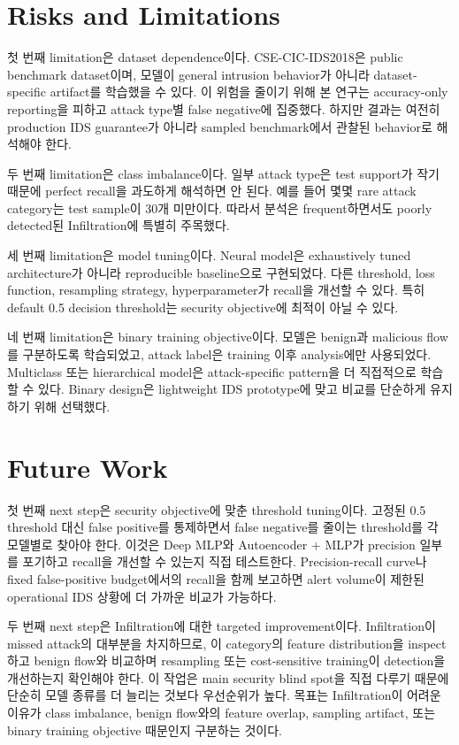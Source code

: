 \documentclass[sigconf,nonacm]{acmart}
\begin{document}
\section{Risks and Limitations}

첫 번째 limitation은 dataset dependence이다.
CSE-CIC-IDS2018은 public benchmark dataset이며, 모델이 general intrusion behavior가 아니라 dataset-specific artifact를 학습했을 수 있다.
이 위험을 줄이기 위해 본 연구는 accuracy-only reporting을 피하고 attack type별 false negative에 집중했다.
하지만 결과는 여전히 production IDS guarantee가 아니라 sampled benchmark에서 관찰된 behavior로 해석해야 한다.

두 번째 limitation은 class imbalance이다.
일부 attack type은 test support가 작기 때문에 perfect recall을 과도하게 해석하면 안 된다.
예를 들어 몇몇 rare attack category는 test sample이 30개 미만이다.
따라서 분석은 frequent하면서도 poorly detected된 Infiltration에 특별히 주목했다.

세 번째 limitation은 model tuning이다.
Neural model은 exhaustively tuned architecture가 아니라 reproducible baseline으로 구현되었다.
다른 threshold, loss function, resampling strategy, hyperparameter가 recall을 개선할 수 있다.
특히 default 0.5 decision threshold는 security objective에 최적이 아닐 수 있다.

네 번째 limitation은 binary training objective이다.
모델은 benign과 malicious flow를 구분하도록 학습되었고, attack label은 training 이후 analysis에만 사용되었다.
Multiclass 또는 hierarchical model은 attack-specific pattern을 더 직접적으로 학습할 수 있다.
Binary design은 lightweight IDS prototype에 맞고 비교를 단순하게 유지하기 위해 선택했다.

\section{Future Work}

첫 번째 next step은 security objective에 맞춘 threshold tuning이다.
고정된 0.5 threshold 대신 false positive를 통제하면서 false negative를 줄이는 threshold를 각 모델별로 찾아야 한다.
이것은 Deep MLP와 Autoencoder + MLP가 precision 일부를 포기하고 recall을 개선할 수 있는지 직접 테스트한다.
Precision-recall curve나 fixed false-positive budget에서의 recall을 함께 보고하면 alert volume이 제한된 operational IDS 상황에 더 가까운 비교가 가능하다.

두 번째 next step은 Infiltration에 대한 targeted improvement이다.
Infiltration이 missed attack의 대부분을 차지하므로, 이 category의 feature distribution을 inspect하고 benign flow와 비교하며 resampling 또는 cost-sensitive training이 detection을 개선하는지 확인해야 한다.
이 작업은 main security blind spot을 직접 다루기 때문에 단순히 모델 종류를 더 늘리는 것보다 우선순위가 높다.
목표는 Infiltration이 어려운 이유가 class imbalance, benign flow와의 feature overlap, sampling artifact, 또는 binary training objective 때문인지 구분하는 것이다.
\end{document}
